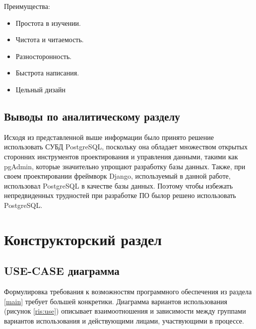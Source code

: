 \documentclass[a4paper,14pt]{extarticle}
\begin{document}
 	Преимущества:
 	
 	\begin{itemize}
 		\item Простота в изучении.
 		\item Чистота и читаемость.
 		\item Разносторонность.
 		\item Быстрота написания.
 		\item Цельный дизайн
 	\end{itemize}
 
 	\subsection*{Выводы по аналитическому разделу}
 	
 	Исходя из представленной выше информации было принято решение использовать СУБД PostgreSQL, поскольку она обладает множеством открытых сторонних инструментов проектирования и управления данными, такими как pgAdmin, которые значительно упрощают разработку базы данных. Также, при своем проектировании фреймворк Django, используемый в данной работе, использовал PostgreSQL в качестве базы данных. Поэтому чтобы избежать непредвиденных трудностей при разработке ПО былор решено использовать PostgreSQL.
 	
 	\newpage
 	\section{Конструкторский раздел}
 	
 	\subsection{USE-CASE диаграмма}
 	
 	Формулировка требования к возможностям программного обеспечения из раздела \ref{main} требует большей конкретики.
 	Диаграмма вариантов использования (рисунок \ref{ris:use}) описывает взаимоотношения и зависимости между группами вариантов использования и действующими лицами, участвующими в процессе.
 	
\end{document}
